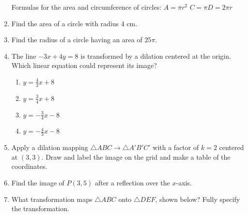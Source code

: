 \documentclass[12pt, twoside]{article}
\begin{document}
\begin{enumerate}
Formulas for the area and circumference of circles:
$A=\pi r^2$
$C=\pi D = 2\pi r$

\item Find the area of a circle with radius 4 cm.
\item Find the radius of a circle having an area of $25 \pi$.


\newpage
  \item The line $-3x+4y=8$ is transformed by a dilation centered at the origin. Which linear equation could represent its image?
  \begin{multicols}{2}
  \begin{enumerate}
    \item $\displaystyle y=\frac{4}{3}x+8$
    \item $\displaystyle y=\frac{3}{4}x+8$
    \item $\displaystyle y=-\frac{3}{4}x-8$
    \item $\displaystyle y=-\frac{4}{3}x-8$
    \end{enumerate}
  \end{multicols}

  \item Apply a dilation mapping $\triangle ABC \rightarrow \triangle A'B'C'$ with a factor of $k=2$ centered at $(3,3)$. Draw and label the image on the grid and make a table of the coordinates.
    \begin{flushright} %
    \end{flushright}
    
  \item Find the image of $P(3,5)$ after a reflection over the $x$-axis.  \vspace{2cm}

  \item What transformation maps $\triangle ABC$ onto $\triangle DEF$, shown below? Fully specify the transformation.
    \begin{flushright}
  \end{flushright}


\end{enumerate}
\end{document}
